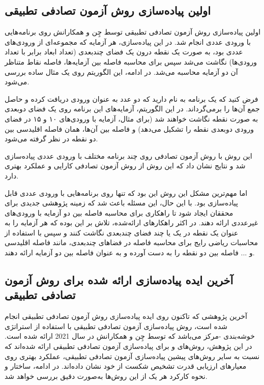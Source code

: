 \subsection{اولین پیاده‌سازی روش آزمون تصادفی تطبیقی}

اولین پیاده‌سازی روش آزمون تصادفی تطبیقی \cite{chen2001proportional} توسط چِن و همکارانش روی برنامه‌هایی با ورودی عددی انجام شد. در این پیاده‌سازی، هر آزمایه که مجموعه‌ای از ورودی‌های عددی بود، به صورت یک نقطه درون یک فضای چندبعدی (تعداد ابعاد برابر با تعداد ورودی‌ها) نگاشت می‌شد سپس برای محاسبه فاصله بین آزمایه‌ها، فاصله نقاط متناظر آن دو آزمایه محاسبه می‌شد. در ادامه، این الگوریتم روی یک مثال ساده بررسی می‌شود.

فرض کنید که یک برنامه به نام  دارید که دو عدد به عنوان ورودی دریافت کرده و حاصل جمع آن‌ها را برمی‌گرداند. در این الگوریتم، آزمایه‌های این برنامه روی یک فضای دوبعدی به صورت نقطه نگاشت خواهند شد (برای مثال، آزمایه با ورودی‌های ۱۰ و ۱۵ در فضای ورودی دوبعدی نقطه  را تشکیل می‌دهد) و فاصله بین آن‌ها، همان فاصله اقلیدسی بین دو نقطه در نظر گرفته می‌شود.

این روش با روش آزمون تصادفی روی چند برنامه مختلف با ورودی عددی پیاده‌سازی شد و نتایج نشان داد که این روش از روش آزمون تصادفی کارایی و عملکرد بهتری دارد.

اما مهم‌ترین مشکل این روش این بود که تنها روی برنامه‌هایی با ورودی عددی قابل پیاده‌سازی بود. با این حال، این مسئله باعث شد که زمینه پژوهشی جدیدی برای محققان ایجاد شود تا راهکاری برای محاسبه فاصله بین دو آزمایه با ورودی‌های غیرعددی ارائه دهند. در اکثر راهکارهای ارائه‌شده، تلاش بر این بوده که هر آزمایه را به عنوان یک نقطه در یک یا چند فضای چندبعدی نگاشت کنند و سپس با استفاده از محاسبات ریاضی رایج برای محاسبه فاصله در فضاهای چندبعدی، مانند فاصله اقلیدسی و ... فاصله بین دو نقطه را به دست آورده و به عنوان فاصله بین دو آزمایه ارائه دهند.

\subsection{آخرین ایده پیاده‌سازی ارائه شده برای روش آزمون تصادفی تطبیقی}

آخرین پژوهشی \cite{chen2021novel} که تاکنون روی ایده پیاده‌سازی روش آزمون تصادفی تطبیقی انجام شده است، روش پیاده‌سازی آزمون تصادفی تطبیقی با استفاده از استراتژی خوشه‌بندی -مرکز می‌باشد که توسط چِن و همکارانش در سال 2021 ارائه شده است. در این پژوهش، روش‌های  و  برای پیاده‌سازی آزمون تصادفی تطبیقی ارائه شده‌اند که نسبت به سایر روش‌های پیشین پیاده‌سازی آزمون تصادفی تطبیقی، عملکرد بهتری روی معیارهای ارزیابی قدرت تشخیص شکست از خود نشان داده‌اند. در ادامه، ساختار و نحوه کارکرد هر یک از این روش‌ها به‌صورت دقیق بررسی خواهد شد.

